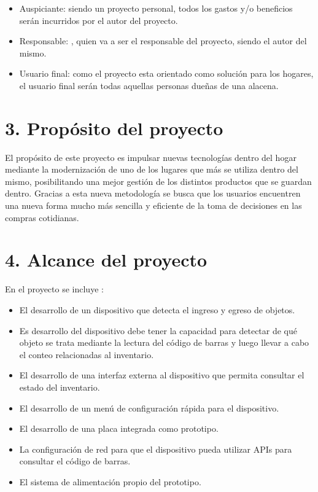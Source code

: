 \documentclass[
11pt, %
codirector, %
]{charter}
\begin{document}
\begin{itemize}
	\item Auspiciante: siendo un proyecto personal, todos los gastos y/o beneficios serán incurridos por el autor del proyecto.
	\item Responsable: \authorname, quien va a ser el responsable del proyecto, siendo el autor del mismo.
 	\item Usuario final: como el proyecto esta orientado como solución para los hogares, el usuario final serán todas aquellas personas dueñas de una alacena.
 
\end{itemize}



\section{3. Propósito del proyecto}
\label{sec:proposito}

El propósito de este proyecto es impulsar nuevas tecnologías dentro del hogar mediante la modernización de uno de los lugares que más se utiliza dentro del mismo, posibilitando una mejor gestión de los distintos productos que se guardan dentro. Gracias a esta nueva metodología se busca que los usuarios encuentren una nueva forma mucho más sencilla y eficiente de la toma de decisiones en las compras cotidianas.

\section{4. Alcance del proyecto}
\label{sec:alcance}

En el proyecto se incluye :

\begin{itemize}
	\item El desarrollo de un dispositivo que detecta el ingreso y egreso de objetos.
	\item Es desarrollo del dispositivo debe tener la capacidad para detectar de qué objeto se trata mediante la lectura del código de barras y luego llevar a cabo el conteo relacionadas al inventario.
 	\item El desarrollo de una interfaz externa al dispositivo que permita consultar el estado del inventario.
  \item El desarrollo de un menú de configuración rápida para el dispositivo.
  \item El desarrollo de una placa integrada como prototipo.
  \item La configuración de red para que el dispositivo pueda utilizar APIs para consultar el código de barras.
  \item El sistema de alimentación propio del prototipo.
  
\end{itemize}
\end{document}
